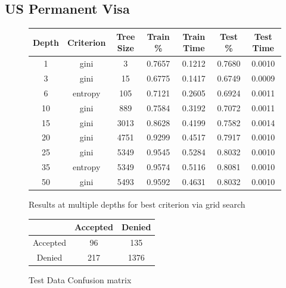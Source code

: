 \documentclass[h]{article}
\begin{document}
\subsection*{US Permanent Visa}
\begin{figure}[H]
\begin{tabular}{ | c | c  | c | c | c | c | c |} 
\hline
\textbf{Depth} & \textbf{Criterion} & \textbf{Tree Size} & \textbf{Train \%} & \textbf{Train Time} & \textbf{Test \%} & \textbf{Test Time}   \\
\hline
1 & gini & 3 & 0.7657 & 0.1212 & 0.7680 & 0.0010 \\ \hline
3 & gini & 15 & 0.6775 & 0.1417 & 0.6749 & 0.0009 \\ \hline
6 & entropy & 105 & 0.7121 & 0.2605 & 0.6924 & 0.0011 \\ \hline
10 & gini & 889 & 0.7584 & 0.3192 & 0.7072 & 0.0011 \\ \hline
15 & gini & 3013 & 0.8628 & 0.4199 & 0.7582 & 0.0014 \\ \hline
20 & gini & 4751 & 0.9299 & 0.4517 & 0.7917 & 0.0010 \\ \hline
25 & gini & 5349 & 0.9545 & 0.5284 & 0.8032 & 0.0010 \\ \hline
35 & entropy & 5349 & 0.9574 & 0.5116 & 0.8081 & 0.0010 \\ \hline
50 & gini & 5493 & 0.9592 & 0.4631 & 0.8032 & 0.0010 \\ \hline
\end{tabular}
\caption*{Results at multiple depths for best criterion via grid search}
\endminipage\hfill
{}
\begin{flushright}
\begin{tabular}{ | c | c | c  | } 
\hline
 & Accepted & Denied  \\
\hline
Accepted & 96 & 135 \\ \hline
Denied & 217 & 1376 \\ \hline
\end{tabular}
\caption*{Test Data Confusion matrix}
\end{flushright}
\endminipage\hfill

\end{figure}
\end{document}
